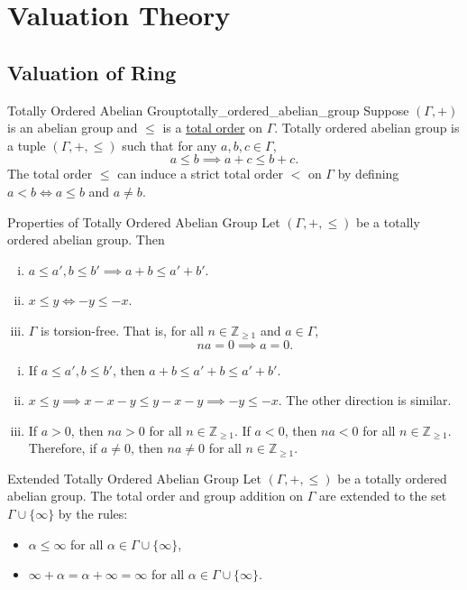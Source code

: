 
\chapter{Valuation Theory}
\section{Valuation of Ring}
\begin{definition}{Totally Ordered Abelian Group}{totally_ordered_abelian_group}
    Suppose $(\Gamma,+)$ is an abelian group and $\le$ is a \hyperref[th:homogeneous_relation]{total order} on $\Gamma$. Totally ordered abelian group is a tuple $(\Gamma,+,\le)$ such that for any $a,b,c\in \Gamma$,
    \[
    a\le b \implies a+c\le b+c.
    \]
    The total order $\le$ can induce a strict total order $<$ on $\Gamma$ by defining $a<b\iff a\le b$ and $a\ne b$.
\end{definition}

\begin{proposition}{Properties of Totally Ordered Abelian Group}{}
    Let $(\Gamma,+,\le)$ be a totally ordered abelian group. Then
    \begin{enumerate}[(i)]
        \item $a\le a',b\le b'\implies a+b\le a'+b'$.
        \item $x\le y\iff -y\le -x$. 
        \item $\Gamma$ is torsion-free. That is, for all $n\in\mathbb{Z}_{\ge1}$ and $a\in\Gamma$, 
        \[
            na= 0\implies 
            a= 0.
        \] 
    \end{enumerate}
\end{proposition}

\begin{prf}
    \begin{enumerate}[(i)]
        \item If $a\le a',b\le b'$, then $a+b\le a'+b\le a'+b'$.
        \item $x\le y\implies x-x-y\le y-x-y\implies -y\le -x$. The other direction is similar.
        \item If $a>0$, then $na>0$ for all $n\in \mathbb{Z}_{\ge 1}$. If $a<0$, then $na<0$ for all $n\in \mathbb{Z}_{\ge 1}$. Therefore, if $a\ne 0$, then $na\ne 0$ for all $n\in \mathbb{Z}_{\ge 1}$.
        
    \end{enumerate}
\end{prf}

\begin{proposition}{Extended Totally Ordered Abelian Group}{}
    Let $(\Gamma,+,\le)$ be a totally ordered abelian group. The total order and group addition on $\Gamma$ are extended to the set $\Gamma \cup\{\infty\}$ by the rules:
    \begin{itemize}
        \item $\alpha\le\infty$ for all $\alpha \in \Gamma\cup\{\infty\}$,
        \item $\infty+\alpha=\alpha+\infty=\infty$ for all $\alpha \in \Gamma\cup\{\infty\}$.
    \end{itemize}
\end{proposition}


